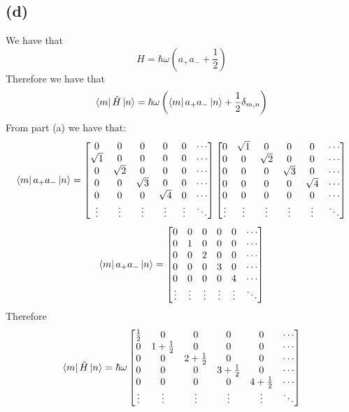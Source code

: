 \documentclass[11pt]{article}
\begin{document}
\subsection*{(d)}
We have that 
$$H=\hbar\omega \left(
    a_{+}a_{-}+\frac{1}{2}
\right)$$
Therefore we have that 
$$\bra{m}\hat{H}\ket{n}=
\hbar\omega\left(
    \bra{m}a_{+}a_{-}\ket{n}+\frac{1}{2}\delta_{m,n}\right)
    $$
From part (a) we have that:
$$\bra{m}a_{+}a_{-}\ket{n}=\begin{bmatrix}
    0 & 0 & 0 & 0 & 0 & \cdots \\
    \sqrt{1} & 0 & 0 & 0 & 0 & \cdots \\
    0 & \sqrt{2} & 0 & 0 & 0 & \cdots \\
    0 & 0 & \sqrt{3} & 0 & 0 & \cdots \\
    0 & 0 & 0 & \sqrt{4} & 0 & \cdots \\
    \vdots & \vdots & \vdots & \vdots & \vdots & \ddots
\end{bmatrix}\begin{bmatrix}
    0 & \sqrt{1} & 0 & 0 & 0 & \cdots \\
    0 & 0 & \sqrt{2} & 0 & 0 & \cdots \\
    0 & 0 & 0 & \sqrt{3} & 0 & \cdots \\
    0 & 0 & 0 & 0 & \sqrt{4} & \cdots \\
    0 & 0 & 0 & 0 & 0 & \cdots \\
    \vdots & \vdots & \vdots & \vdots & \vdots & \ddots
\end{bmatrix}
$$
$$\bra{m}a_{+}a_{-}\ket{n}
=\begin{bmatrix}
    0 & 0 & 0 & 0 & 0 & \cdots \\
    0 & 1 & 0 & 0 & 0 & \cdots \\
    0 & 0 & 2 & 0 & 0 & \cdots \\
    0 & 0 & 0 & 3 & 0 & \cdots \\
    0 & 0 & 0 & 0 & 4 & \cdots \\
    \vdots & \vdots & \vdots & \vdots & \vdots & \ddots
\end{bmatrix}
$$
Therefore 
$$\bra{m}\hat{H}\ket{n}=
\hbar\omega
    \begin{bmatrix}
    \frac{1}{2} & 0 & 0 & 0 & 0 & \cdots \\
    0 & 1+\frac{1}{2} & 0 & 0 & 0 & \cdots \\
    0 & 0 & 2+\frac{1}{2} & 0 & 0 & \cdots \\
    0 & 0 & 0 & 3+\frac{1}{2} & 0 & \cdots \\
    0 & 0 & 0 & 0 & 4+\frac{1}{2} & \cdots \\
    \vdots & \vdots & \vdots & \vdots & \vdots & \ddots
\end{bmatrix}
$$
\end{document}
